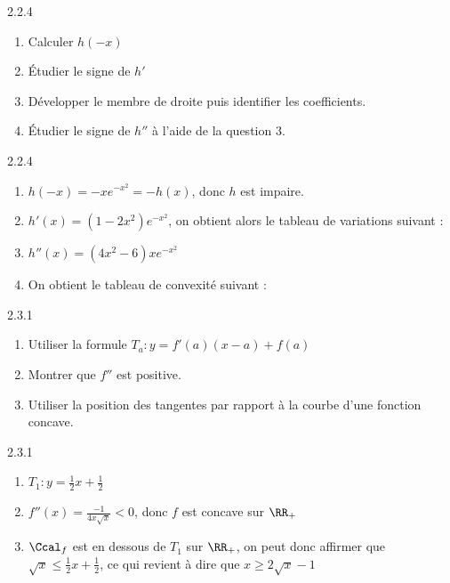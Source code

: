 \begin{Indication}{2.2.4}
	\begin{enumerate}
		\item Calculer $h(-x)$
		\item Étudier le signe de $h'$
		\item Développer le membre de droite puis identifier les coefficients.
		\item Étudier le signe de $h''$ à l'aide de la question 3.
	\end{enumerate}
\end{Indication}
\begin{Solution}{2.2.4}
	\begin{enumerate}
		\item $h(-x)=-xe^{-x^2}=-h(x)$, donc $h$ est impaire.
		\item $h'(x)=(1-2x^2)e^{-x^2}$, on obtient alors le tableau de variations suivant :
		
		\item $h''(x)=(4x^2-6)xe^{-x^2}$
		\item On obtient le tableau de convexité suivant :
		
	\end{enumerate}
\end{Solution}
\begin{Indication}{2.3.1}
	\begin{enumerate}
		\item Utiliser la formule $T_a:y=f'(a)(x-a)+f(a)$
		\item Montrer que $f''$ est positive.
		\item Utiliser la position des tangentes par rapport à la courbe d'une fonction concave.
	\end{enumerate}
\end{Indication}
\begin{Solution}{2.3.1}
	\begin{enumerate}
		\item $T_1:y=\frac{1}{2}x+\frac{1}{2}$
		\item $f''(x)=\frac{-1}{4x\sqrt{x}}<0$, donc $f$ est concave sur $\RR_+$
		\item $\Ccal_f$ est en dessous de $T_1$ sur $\RR_+$, on peut donc affirmer que $\sqrt{x}\leq\frac{1}{2}x+\frac{1}{2}$, ce qui revient à dire que $x\geq2\sqrt{x}-1$
	\end{enumerate}
\end{Solution}
